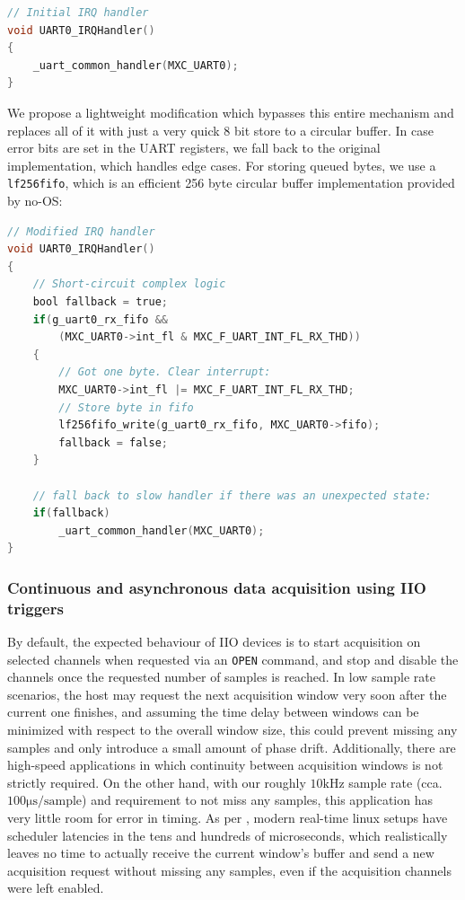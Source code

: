 \documentclass{thesis}
\newcommand{\kHz}{\unit{\kilo\hertz}}
\newcommand{\us}{\unit{\micro\second}}
\begin{document}
\begin{lstlisting}[language=C]
// Initial IRQ handler
void UART0_IRQHandler()
{
    _uart_common_handler(MXC_UART0);
}
\end{lstlisting}

We propose a lightweight modification which bypasses this entire mechanism and replaces all of it with just a very quick 8 bit store to a circular buffer. In case error bits are set in the UART registers, we fall back to the original implementation, which handles edge cases. For storing queued bytes, we use a \texttt{lf256fifo}, which is an efficient 256 byte circular buffer implementation provided by no-OS:

\begin{lstlisting}[language=C]
// Modified IRQ handler
void UART0_IRQHandler()
{
    // Short-circuit complex logic
    bool fallback = true;
    if(g_uart0_rx_fifo &&
        (MXC_UART0->int_fl & MXC_F_UART_INT_FL_RX_THD))
    {
        // Got one byte. Clear interrupt:
        MXC_UART0->int_fl |= MXC_F_UART_INT_FL_RX_THD;
        // Store byte in fifo
        lf256fifo_write(g_uart0_rx_fifo, MXC_UART0->fifo);
        fallback = false;
    }

    // fall back to slow handler if there was an unexpected state:
    if(fallback)
        _uart_common_handler(MXC_UART0);
}
\end{lstlisting}

\subsubsection{Continuous and asynchronous data acquisition using IIO triggers}

By default, the expected behaviour of IIO devices is to start acquisition on selected channels when requested via an \texttt{OPEN} command, and stop and disable the channels once the requested number of samples is reached. In low sample rate scenarios, the host may request the next acquisition window very soon after the current one finishes, and assuming the time delay between windows can be minimized with respect to the overall window size, this could prevent missing any samples and only introduce a small amount of phase drift. Additionally, there are high-speed applications in which continuity between acquisition windows is not strictly required. On the other hand, with our roughly $10\kHz$ sample rate (cca. $100\us/\text{sample}$) and requirement to not miss any samples, this application has very little room for error in timing. As per \cite{linuxlatency}, modern real-time linux setups have scheduler latencies in the tens and hundreds of microseconds, which realistically leaves no time to actually receive the current window's buffer and send a new acquisition request without missing any samples, even if the acquisition channels were left enabled.
\end{document}

